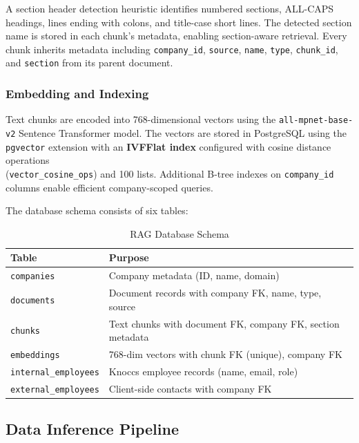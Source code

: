 A section header detection heuristic identifies numbered sections, ALL-CAPS headings, lines ending with colons, and title-case short lines. The detected section name is stored in each chunk's metadata, enabling section-aware retrieval. Every chunk inherits metadata including \texttt{company\_id}, \texttt{source}, \texttt{name}, \texttt{type}, \texttt{chunk\_id}, and \texttt{section} from its parent document.

\subsubsection{Embedding and Indexing}

Text chunks are encoded into 768-dimensional vectors using the \texttt{all-mpnet-base-v2} Sentence Transformer model. The vectors are stored in PostgreSQL using the \texttt{pgvector} extension with an \textbf{IVFFlat index} configured with cosine distance operations \\ (\texttt{vector\_cosine\_ops}) and 100 lists. Additional B-tree indexes on \texttt{company\_id} columns enable efficient company-scoped queries.

The database schema consists of six tables:

\begin{table}[H]
\centering
\caption{RAG Database Schema}
\label{tab:rag_schema}
\begin{tabular}{|l|p{9cm}|}
\hline
\textbf{Table} & \textbf{Purpose} \\ \hline
\texttt{companies} & Company metadata (ID, name, domain) \\ \hline
\texttt{documents} & Document records with company FK, name, type, source \\ \hline
\texttt{chunks} & Text chunks with document FK, company FK, section metadata \\ \hline
\texttt{embeddings} & 768-dim vectors with chunk FK (unique), company FK \\ \hline
\texttt{internal\_employees} & Knoccs employee records (name, email, role) \\ \hline
\texttt{external\_employees} & Client-side contacts with company FK \\ \hline
\end{tabular}
\end{table}

\subsection{Data Inference Pipeline}

